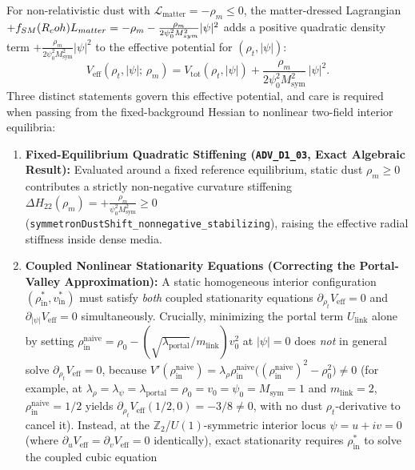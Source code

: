 For non-relativistic dust with $\mathcal{L}_{\mathrm{matter}} = -\rho_m \le 0$, the matter-dressed Lagrangian $+f_{SM}(R_coh)L_{matter} = -\rho_m - \frac{\rho_m}{2\psi_0^2 M_{sym}^2}|\psi|^2$ adds a positive quadratic density term $+\frac{\rho_m}{2\psi_0^2 M_{\mathrm{sym}}^2}|\psi|^2$ to the effective potential for $(\rho_t, |\psi|)$:
\begin{equation}
V_{\mathrm{eff}}(\rho_t, |\psi|;\,\rho_m)
= V_{\mathrm{tot}}(\rho_t, |\psi|) + \frac{\rho_m}{2\psi_0^2 M_{\mathrm{sym}}^2}\,|\psi|^2.
\label{eq:symmetron_Veff_sec6}
\end{equation}
Three distinct statements govern this effective potential, and care is required when passing from the fixed-background Hessian to nonlinear two-field interior equilibria:
\begin{enumerate}[leftmargin=2em]
  \item \textbf{Fixed-Equilibrium Quadratic Stiffening (\texttt{ADV\_D1\_03}, Exact Algebraic Result):} Evaluated around a fixed reference equilibrium, static dust $\rho_m \ge 0$ contributes a strictly non-negative curvature stiffening $\Delta H_{22}(\rho_m) = +\frac{\rho_m}{\psi_0^2 M_{\mathrm{sym}}^2} \ge 0$ (\texttt{symmetronDustShift\_nonnegative\_stabilizing}), raising the effective radial stiffness inside dense media.
  \item \textbf{Coupled Nonlinear Stationarity Equations (Correcting the Portal-Valley Approximation):} A static homogeneous interior configuration $(\rho_{\mathrm{in}}^*, v_{\mathrm{in}}^*)$ must satisfy \emph{both} coupled stationarity equations $\partial_{\rho_t} V_{\mathrm{eff}} = 0$ and $\partial_{|\psi|} V_{\mathrm{eff}} = 0$ simultaneously. Crucially, minimizing the portal term $U_{\mathrm{link}}$ alone by setting $\rho_{\mathrm{in}}^{\mathrm{naive}} = \rho_0 - (\sqrt{\lambda_{\mathrm{portal}}}/m_{\mathrm{link}})v_0^2$ at $|\psi| = 0$ does \emph{not} in general solve $\partial_{\rho_t} V_{\mathrm{eff}} = 0$, because $V'(\rho_{\mathrm{in}}^{\mathrm{naive}}) = \lambda_\rho\rho_{\mathrm{in}}^{\mathrm{naive}}\bigl((\rho_{\mathrm{in}}^{\mathrm{naive}})^2 - \rho_0^2\bigr) \ne 0$ (for example, at $\lambda_\rho = \lambda_\psi = \lambda_{\mathrm{portal}} = \rho_0 = v_0 = \psi_0 = M_{\mathrm{sym}} = 1$ and $m_{\mathrm{link}} = 2$, $\rho_{\mathrm{in}}^{\mathrm{naive}} = 1/2$ yields $\partial_{\rho_t} V_{\mathrm{eff}}(1/2, 0) = -3/8 \ne 0$, with no dust $\rho_t$-derivative to cancel it). Instead, at the $\mathbb{Z}_2$/$U(1)$-symmetric interior locus $\psi = u + iv = 0$ (where $\partial_u V_{\mathrm{eff}} = \partial_v V_{\mathrm{eff}} = 0$ identically), exact stationarity requires $\rho_{\mathrm{in}}^*$ to solve the coupled cubic equation

\end{enumerate}
